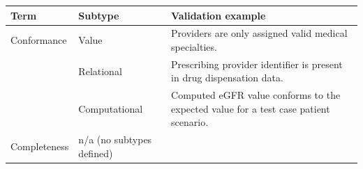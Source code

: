 \documentclass[11pt]{book}
\theoremstyle{definition}
\theoremstyle{definition}
\theoremstyle{definition}
\theoremstyle{remark}
\begin{document}
\begin{longtable}[]{@{}lll@{}}
\toprule
\begin{minipage}[b]{0.08\columnwidth}\raggedright
Term\strut
\end{minipage} & \begin{minipage}[b]{0.16\columnwidth}\raggedright
Subtype\strut
\end{minipage} & \begin{minipage}[b]{0.67\columnwidth}\raggedright
Validation example\strut
\end{minipage}\tabularnewline
\midrule
\endhead
\begin{minipage}[t]{0.08\columnwidth}\raggedright
Conformance\strut
\end{minipage} & \begin{minipage}[t]{0.16\columnwidth}\raggedright
Value\strut
\end{minipage} & \begin{minipage}[t]{0.67\columnwidth}\raggedright
Providers are only assigned valid medical specialties.\strut
\end{minipage}\tabularnewline
\begin{minipage}[t]{0.08\columnwidth}\raggedright
\strut
\end{minipage} & \begin{minipage}[t]{0.16\columnwidth}\raggedright
Relational\strut
\end{minipage} & \begin{minipage}[t]{0.67\columnwidth}\raggedright
Prescribing provider identifier is present in drug dispensation data.\strut
\end{minipage}\tabularnewline
\begin{minipage}[t]{0.08\columnwidth}\raggedright
\strut
\end{minipage} & \begin{minipage}[t]{0.16\columnwidth}\raggedright
Computational\strut
\end{minipage} & \begin{minipage}[t]{0.67\columnwidth}\raggedright
Computed eGFR value conforms to the expected value for a test case patient scenario.\strut
\end{minipage}\tabularnewline
\begin{minipage}[t]{0.08\columnwidth}\raggedright
Completeness\strut
\end{minipage} & \begin{minipage}[t]{0.16\columnwidth}\raggedright
n/a (no subtypes defined)\strut
\end{minipage} & \begin{minipage}[t]{0.67\columnwidth}\raggedright

\end{minipage}
\end{longtable}
\end{document}
